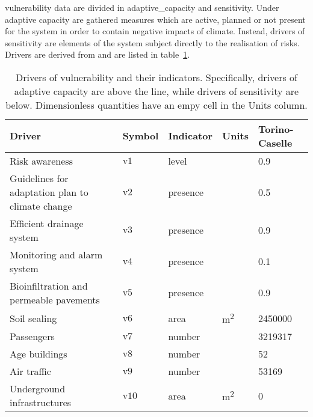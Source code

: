 \Gls{vulnerability} data are divided in \gls{adaptive_capacity} and \gls{sensitivity}. Under adaptive capacity are gathered measures which are active, planned or not present for the system in order to contain negative \glspl{impact} of climate. Instead, \glspl{driver} of sensitivity are elements of the system subject directly to the realisation of risks. Drivers are derived from \cite[555-556,558]{2022DeVivoRiskAssessment} and are listed in table~\ref{tab:drivers_vulnerability}.
\begin{table}[h]
  \centering
  \caption{Drivers of vulnerability and their indicators. Specifically, drivers of adaptive capacity are above the line, while drivers of sensitivity are below. Dimensionless quantities have an empy cell in the Units column.}
  \label{tab:drivers_vulnerability}
  \begin{tabular}{p{}llll}
    Driver                                           & Symbol         & Indicator & Units                & Torino-Caselle \\
    \hline
    Risk awareness                                   & $\mathrm{v1}$  & level     &                      & 0.9            \\
    Guidelines for adaptation plan to climate change & $\mathrm{v2}$  & presence  &                      & 0.5            \\
    Efficient drainage system                        & $\mathrm{v3}$  & presence  &                      & 0.9            \\
    Monitoring and alarm system                      & $\mathrm{v4}$  & presence  &                      & 0.1            \\
    Bioinfiltration and permeable pavements          & $\mathrm{v5}$  & presence  &                      & 0.9            \\
    \hline
    Soil sealing                                     & $\mathrm{v6}$  & area      & \unit{\square\metre} & 2450000        \\
    Passengers                                       & $\mathrm{v7}$  & number    &                      & 3219317        \\
    Age buildings                                    & $\mathrm{v8}$  & number    &                      & 52             \\
    Air traffic                                      & $\mathrm{v9}$  & number    &                      & 53169          \\
    Underground infrastructures                      & $\mathrm{v10}$ & area      & \unit{\square\metre} & 0              \\
    \end{tabular}
\end{table}

